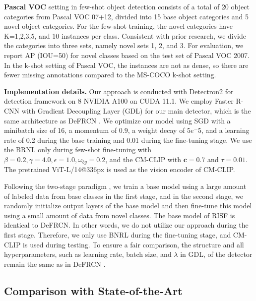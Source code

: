 \documentclass{article}
\begin{document}
{\bf Pascal VOC} setting in few-shot object detection consists of a total of 20 object categories from Pascal VOC 07+12, divided into 15 base object categories and 5 novel object categories. For the few-shot training, the novel categories have K=1,2,3,5, and 10 instances per class. Consistent with prior research, we divide the categories into three sets, namely novel sets 1, 2, and 3. For evaluation, we report AP (IOU=50) for novel classes based on the test set of Pascal VOC 2007.
In the k-shot setting of Pascal VOC, the instances are not as dense, so there are fewer missing annotations compared to the MS-COCO k-shot setting.

{\bf Implementation details.} Our approach is conducted with Detectron2 \cite{detectron2} for detection framework on 8 NVIDIA A100 on CUDA 11.1. 
We employ Faster R-CNN with Gradient Decoupling Layer (GDL) for our main detector, which is the same architecture as DeFRCN \cite{defrcn}. 
We optimize our model using SGD with a minibatch size of 16, a momentum of 0.9, a weight decay of $5e^-5$, and a learning rate of 0.2 during the base training and 0.01 during the fine-tuning stage.
We use the BRNL only during few-shot fine-tuning with $\beta=0.2, \gamma=4.0, \epsilon=1.0, \omega_{bg}=0.2$, and the CM-CLIP with $\mathbf{c}=0.7$ and $\tau=0.01$. 
The pretrained ViT-L/14@336px is used as the vision encoder of CM-CLIP.

Following the two-stage paradigm \cite{tfa}, we train a base model using a large amount of labeled data from base classes in the first stage, and in the second stage, 
we randomly initialize output layers of the base model and then fine-tune this model using a small amount of data from novel classes.
The base model of RISF is identical to DeFRCN.
In other words, we do not utilize our approach during the first stage.
Therefore, we only use BNRL during the fine-tuning stage, and CM-CLIP is used during testing. 
To ensure a fair comparison, the structure and all hyperparameters, such as learning rate, batch size, and $\lambda$ in GDL, of the detector remain the same as in DeFRCN \cite{defrcn}.

\subsection{Comparison with State-of-the-Art}
\end{document}

